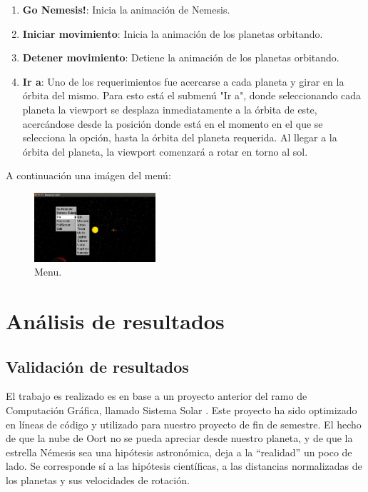 \documentclass[journal]{IEEEtran}
\begin{document}
\begin{enumerate}
	\item \textbf{Go Nemesis!}: Inicia la animación de Nemesis.
	\item \textbf{Iniciar movimiento}: Inicia la animación de los planetas orbitando.
	\item \textbf{Detener movimiento}: Detiene la animación de los planetas orbitando.
	\item \textbf{Ir a}: Uno de los requerimientos fue acercarse a cada planeta y girar en la órbita del mismo.  Para esto está el submenú "Ir a", donde seleccionando cada planeta la viewport se desplaza inmediatamente a la órbita de este, acercándose desde la posición donde está en el momento en el que se selecciona la opción, hasta la órbita del planeta requerida. Al llegar a la órbita del planeta, la viewport comenzará a rotar en torno al sol.
\end{enumerate}

A continuación una imágen del menú:

\begin{figure}[h!]
	\includegraphics[width=0.4\textwidth, height=0.25\textwidth]{menu.png}
	\centering
	\caption{Menu.}
\end{figure}

\section{Análisis de resultados}

\subsection{Validación de resultados}

 El trabajo es realizado es en base a un proyecto anterior del ramo de Computación Gráfica, llamado Sistema Solar \cite{anterior}. Este proyecto ha sido optimizado en líneas de código y utilizado para nuestro proyecto de fin de semestre. El hecho de que la nube de Oort no se pueda apreciar desde nuestro planeta, y de que la estrella Némesis sea una hipótesis astronómica, deja a la “realidad” un poco de lado. Se corresponde sí a las hipótesis científicas, a las distancias normalizadas de los planetas y sus velocidades de rotación.
\end{document}
